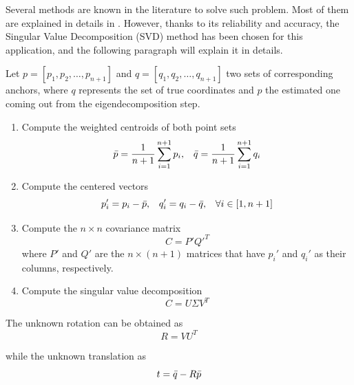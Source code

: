 Several methods are known in the literature to solve such problem. Most of them are explained in details in \cite{RisteskaStojkoska2014NodesAlgorithm}. However, thanks to its reliability and accuracy, the Singular Value Decomposition (SVD) method has been chosen for this application, and the following paragraph will explain it in details. \par

Let $p = \left[p_1, p_2, \dots, p_{n+1}\right]$ and $q = \left[q_1, q_2, \dots, q_{n+1}\right]$ two sets of corresponding anchors, where $q$ represents the set of true coordinates and $p$ the estimated one coming out from the eigendecomposition step.

\begin{enumerate}
    \item Compute the weighted centroids of both point sets
    \begin{equation}
        \Bar{p} = \frac{1}{n+1} \sum_{i=1}^{n+1} p_i \text{,}\quad \Bar{q} = \frac{1}{n+1} \sum_{i=1}^{n+1} q_i
    \end{equation}

    \item Compute the centered vectors
    \begin{equation}
        p_i' = p_i - \Bar{p} \text{,}\quad q_i' = q_i - \Bar{q}\text{,}  \quad \forall i \in \left[1, n+1\right]
    \end{equation}

    \item Compute the $n\times n$ covariance matrix
    \begin{equation}
        C =  P' {Q'}^T
    \end{equation}
    where $P'$ and $Q'$ are the $n \times (n+1)$ matrices that have $p_i'$ and $q_i'$ as their columns, respectively.

    \item Compute the singular value decomposition
    \begin{equation}
        C = U\Sigma V^T
    \end{equation}
\end{enumerate}

The unknown rotation can be obtained as
\begin{equation}
    R = V U^T
\end{equation}

while the unknown translation as
\begin{equation}
    t = \Bar{q} - R\Bar{p}
\end{equation}


